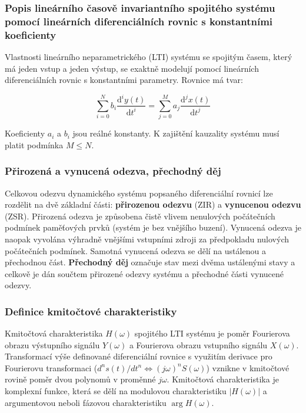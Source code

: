     \subsubsection{Popis lineárního časově invariantního spojitého systému pomocí lineárních diferenciálních rovnic s konstantními koeficienty} 
        Vlastnosti lineárního neparametrického (LTI) systému se spojitým časem, který má jeden vstup a jeden výstup, se exaktně modelují pomocí lineárních diferenciálních rovnic s konstantními parametry. Rovnice má tvar:

        \begin{equation*}
        \sum_{i=0}^{N} b_i \frac{\text{d}^i y(t)}{\text{d}t^i} = \sum_{j=0}^{M} a_j \frac{\text{d}^j x(t)}{\text{d}t^j}
        \end{equation*}
        
        Koeficienty $a_i$ a $b_i$ jsou reálné konstanty. K zajištění kauzality systému musí platit podmínka $M \le N$.
    \subsubsection{Přirozená a vynucená odezva, přechodný děj} 
        Celkovou odezvu dynamického systému popsaného diferenciální rovnicí lze rozdělit na dvě základní části: \textbf{přirozenou odezvu} (ZIR) a \textbf{vynucenou odezvu} (ZSR). Přirozená odezva je způsobena čistě vlivem nenulových počátečních podmínek paměťových prvků (systém je bez vnějšího buzení). Vynucená odezva je naopak vyvolána výhradně vnějšími vstupními zdroji za předpokladu nulových počátečních podmínek. Samotná vynucená odezva se dělí na ustálenou a přechodnou část. \textbf{Přechodný děj} označuje stav mezi dvěma ustálenými stavy a celkově je dán součtem přirozené odezvy systému a přechodné části vynucené odezvy.
    \subsubsection{Definice kmitočtové charakteristiky}
        Kmitočtová charakteristika $H(\omega)$ spojitého LTI systému je poměr Fourierova obrazu výstupního signálu $Y(\omega)$ a Fourierova obrazu vstupního signálu $X(\omega)$. Transformací výše definované diferenciální rovnice s využitím derivace pro Fourierovu transformaci ($d^n s(t)/dt^n \Leftrightarrow (j\omega)^n S(\omega)$) vznikne v kmitočtové rovině poměr dvou polynomů v proměnné $j\omega$. Kmitočtová charakteristika je komplexní funkce, která se dělí na modulovou charakteristiku $|H(\omega)|$ a argumentovou neboli fázovou charakteristiku $\arg H(\omega)$.
